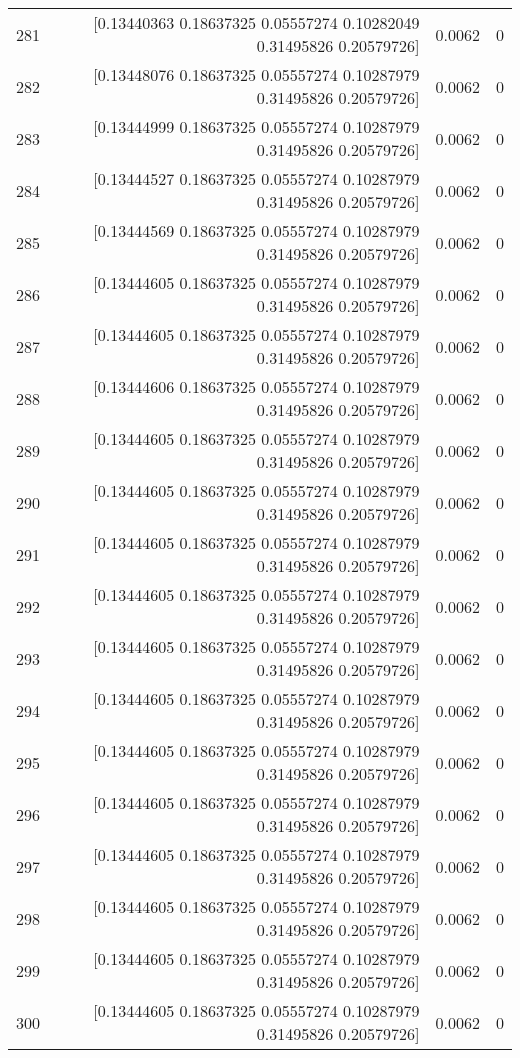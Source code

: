 \begin{longtable}{lrrr}
281 & [0.13440363 0.18637325 0.05557274 0.10282049 0.31495826 0.20579726] & 0.0062 & 0 \\
282 & [0.13448076 0.18637325 0.05557274 0.10287979 0.31495826 0.20579726] & 0.0062 & 0 \\
283 & [0.13444999 0.18637325 0.05557274 0.10287979 0.31495826 0.20579726] & 0.0062 & 0 \\
284 & [0.13444527 0.18637325 0.05557274 0.10287979 0.31495826 0.20579726] & 0.0062 & 0 \\
285 & [0.13444569 0.18637325 0.05557274 0.10287979 0.31495826 0.20579726] & 0.0062 & 0 \\
286 & [0.13444605 0.18637325 0.05557274 0.10287979 0.31495826 0.20579726] & 0.0062 & 0 \\
287 & [0.13444605 0.18637325 0.05557274 0.10287979 0.31495826 0.20579726] & 0.0062 & 0 \\
288 & [0.13444606 0.18637325 0.05557274 0.10287979 0.31495826 0.20579726] & 0.0062 & 0 \\
289 & [0.13444605 0.18637325 0.05557274 0.10287979 0.31495826 0.20579726] & 0.0062 & 0 \\
290 & [0.13444605 0.18637325 0.05557274 0.10287979 0.31495826 0.20579726] & 0.0062 & 0 \\
291 & [0.13444605 0.18637325 0.05557274 0.10287979 0.31495826 0.20579726] & 0.0062 & 0 \\
292 & [0.13444605 0.18637325 0.05557274 0.10287979 0.31495826 0.20579726] & 0.0062 & 0 \\
293 & [0.13444605 0.18637325 0.05557274 0.10287979 0.31495826 0.20579726] & 0.0062 & 0 \\
294 & [0.13444605 0.18637325 0.05557274 0.10287979 0.31495826 0.20579726] & 0.0062 & 0 \\
295 & [0.13444605 0.18637325 0.05557274 0.10287979 0.31495826 0.20579726] & 0.0062 & 0 \\
296 & [0.13444605 0.18637325 0.05557274 0.10287979 0.31495826 0.20579726] & 0.0062 & 0 \\
297 & [0.13444605 0.18637325 0.05557274 0.10287979 0.31495826 0.20579726] & 0.0062 & 0 \\
298 & [0.13444605 0.18637325 0.05557274 0.10287979 0.31495826 0.20579726] & 0.0062 & 0 \\
299 & [0.13444605 0.18637325 0.05557274 0.10287979 0.31495826 0.20579726] & 0.0062 & 0 \\
300 & [0.13444605 0.18637325 0.05557274 0.10287979 0.31495826 0.20579726] & 0.0062 & 0 \\

\end{longtable}
